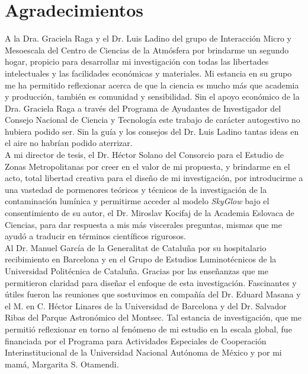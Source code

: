 \chapter{Agradecimientos}

A la Dra. Graciela Raga y el Dr. Luis Ladino del grupo de Interacción Micro y Mesoescala del Centro de Ciencias de la Atmósfera por brindarme un segundo hogar, propicio para desarrollar mi investigación con todas las libertades intelectuales y las facilidades económicas y materiales. Mi estancia en su grupo me ha permitido reflexionar acerca de que la ciencia es mucho más que academia y producción, también es comunidad y sensibilidad. Sin el apoyo económico de la Dra. Graciela Raga a través del Programa de Ayudantes de Investigador del Consejo Nacional de Ciencia y Tecnología este trabajo de carácter autogestivo no hubiera podido ser. Sin la guía y los consejos del Dr. Luis Ladino tantas ideas en el aire no habrían podido aterrizar.\\

A mi director de tesis, el Dr. Héctor Solano del Consorcio para el Estudio de Zonas Metropolitanas por creer en el valor de mi propuesta, y brindarme en el acto, total libertad creativa para el diseño de mi investigación, por introducirme a una vastedad de pormenores teóricos y técnicos de la investigación de la contaminación lumínica y permitirme acceder al modelo \textit{SkyGlow} bajo el consentimiento de su autor, el Dr. Miroslav Kocifaj de la Academia Eslovaca de Ciencias, para dar respuesta a mis más viscerales preguntas, mismas que me ayudó a traducir en términos científicos rigurosos.\\

Al Dr. Manuel García de la Generalitat de Cataluña por su hospitalario recibimiento en Barcelona y en el Grupo de Estudios Luminotécnicos de la Universidad Politécnica de Cataluña. Gracias por las enseñanzas que me permitieron claridad para diseñar el enfoque de esta investigación. Fascinantes y útiles fueron las reuniones que sostuvimos en compañía del Dr. Eduard Masana y el M. en C. Héctor Linares de la Universidad de Barcelona y del Dr. Salvador Ribas del Parque Astronómico del Montsec. Tal estancia de investigación, que me permitió reflexionar en torno al fenómeno de mi estudio en la escala global, fue financiada por el Programa para Actividades Especiales de Cooperación Interinstitucional de la Universidad Nacional Autónoma de México y por mi mamá, Margarita S. Otamendi.\\


